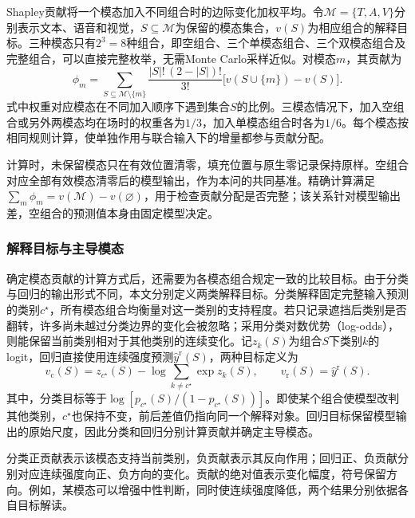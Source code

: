 Shapley贡献将一个模态加入不同组合时的边际变化加权平均。令$\mathcal M=\{T,A,V\}$分别表示文本、语音和视觉，$S\subseteq\mathcal M$为保留的模态集合，$v(S)$为相应组合的解释目标。三种模态只有$2^3=8$种组合，即空组合、三个单模态组合、三个双模态组合及完整组合，可以直接完整枚举，无需Monte Carlo采样近似。对模态$m$，其贡献为
\begin{equation}
\phi_m
=\sum_{S\subseteq\mathcal M\setminus\{m\}}
\frac{|S|!\,(2-|S|)!}{3!}
\bigl[v(S\cup\{m\})-v(S)\bigr].
\label{eq:q3_shapley}
\end{equation}
\QThreeParagraph 式中权重对应模态在不同加入顺序下遇到集合$S$的比例。三模态情况下，加入空组合或另外两模态均在场时的权重各为$1/3$，加入单模态组合时各为$1/6$。每个模态按相同规则计算，使单独作用与联合输入下的增量都参与贡献分配。

\QThreeParagraph 计算时，未保留模态只在有效位置清零，填充位置与原生零记录保持原样。空组合对应全部有效模态清零后的模型输出，作为本问的共同基准。精确计算满足$\sum_m\phi_m=v(\mathcal M)-v(\varnothing)$，用于检查贡献分配是否完整；该关系针对模型输出差，空组合的预测值本身由固定模型决定。

\subsubsection{解释目标与主导模态}
\QThreeParagraph 确定模态贡献的计算方式后，还需要为各模态组合规定一致的比较目标。由于分类与回归的输出形式不同，本文分别定义两类解释目标。分类解释固定完整输入预测的类别$c^\star$，所有模态组合均衡量对这一类别的支持程度。若只记录遮挡后类别是否翻转，许多尚未越过分类边界的变化会被忽略；采用分类对数优势（log-odds），则能保留当前类别相对于其他类别的连续变化。记$z_k(S)$为组合$S$下类别$k$的logit，回归直接使用连续强度预测$\widehat y^{\mathrm r}(S)$，两种目标定义为
\begin{equation}
v_{\mathrm c}(S)
=z_{c^\star}(S)-\log\!\sum_{k\ne c^\star}\exp z_k(S),
\qquad
v_{\mathrm r}(S)=\widehat y^{\mathrm r}(S).
\label{eq:q3_value}
\end{equation}
\QThreeParagraph 其中，分类目标等于$\log[p_{c^\star}(S)/(1-p_{c^\star}(S))]$。即使某个组合使模型改判其他类别，$c^\star$也保持不变，前后差值仍指向同一个解释对象。回归目标保留模型输出的原始尺度，因此分类和回归分别计算贡献并确定主导模态。

\QThreeParagraph 分类正贡献表示该模态支持当前类别，负贡献表示其反向作用；回归正、负贡献分别对应连续强度向正、负方向的变化。贡献的绝对值表示变化幅度，符号保留方向。例如，某模态可以增强中性判断，同时使连续强度降低，两个结果分别依据各自目标解读。

